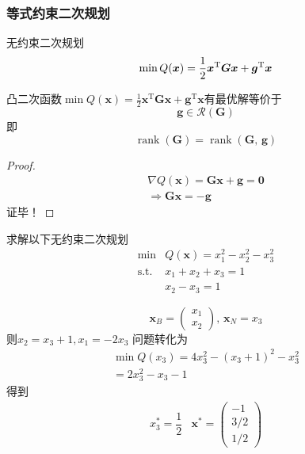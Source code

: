 \subsubsection{等式约束二次规划}
\begin{note}
    \colorbox{cyan!50}{无约束二次规划}
    \[
        \operatorname*{min} Q(\boldsymbol{x})=\frac{1}{2}\boldsymbol{x}^{\mathrm{T}}\boldsymbol{G}\boldsymbol{x}+\boldsymbol{g}^{\mathrm{T}}\boldsymbol{x}\\
    \]
\end{note}
\begin{theorem}
    凸二次函数$\operatorname*{min} Q(\boldsymbol{x})=\frac{1}{2}\boldsymbol{x}^{\mathrm{T}}\boldsymbol{G}\boldsymbol{x}+\boldsymbol{g}^{\mathrm{T}}\boldsymbol{x}$有最优解等价于
    \[
        \boldsymbol{g}\in \mathcal{R}(\boldsymbol{G})
    \]即
    \[
        \operatorname{rank}(\boldsymbol{G}) = \operatorname{rank}(\boldsymbol{G},\, \boldsymbol{g})
    \]
\end{theorem}
\begin{proof}
    \[
        \begin{array}{l}
            \nabla Q(\boldsymbol{x}) = \boldsymbol{Gx}+\boldsymbol{g} = \boldsymbol{0}\\
            \Rightarrow \boldsymbol{Gx} = -\boldsymbol{g}
        \end{array}
    \]证毕！
\end{proof}
\begin{example}
    求解以下\colorbox{cyan!50}{无约束二次规划}
    \[
        \begin{array}{rl}
            \min & Q (\boldsymbol{x}) = x_1^2-x_2^2-x_3^2\\
            \operatorname{s.t.} & x_1+x_2+x_3 = 1\\
            & x_2-x_3 = 1
        \end{array}
    \]
    \begin{solution}
        \[
            \boldsymbol{x}_B = \begin{pmatrix}
                x_1\\x_2
            \end{pmatrix},\, \boldsymbol{x}_N = x_3
        \]
        则$x_2 = x_3+1,x_1 = -2x_3$
        问题转化为
        \[
            \begin{array}{l}
                \min Q(x_3) = 4x_3^2-(x_3+1)^2-x_3^2\\
                =2x_3^2-x_3-1
            \end{array}
        \]
        得到
        \[
            \begin{array}{cc}
                x_3^* = \dfrac{1}{2} &
                \boldsymbol{x}^* = \begin{pmatrix}
                    -1\\ 3/2\\ 1/2
                \end{pmatrix}
            \end{array}
        \]
    \end{solution}
\end{example}

